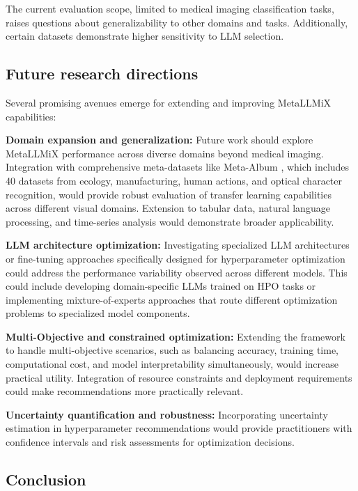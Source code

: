 \documentclass{article}
\begin{document}
The current evaluation scope, limited to medical imaging classification tasks, raises questions about generalizability to other domains and tasks. Additionally, certain datasets demonstrate higher sensitivity to LLM selection.

\subsection{Future research directions}

Several promising avenues emerge for extending and improving MetaLLMiX capabilities:

\textbf{Domain expansion and generalization:} Future work should explore MetaLLMiX performance across diverse domains beyond medical imaging. Integration with comprehensive meta-datasets like Meta-Album \cite{ullah2022meta}, which includes 40 datasets from ecology, manufacturing, human actions, and optical character recognition, would provide robust evaluation of transfer learning capabilities across different visual domains. Extension to tabular data, natural language processing, and time-series analysis would demonstrate broader applicability.


\textbf{LLM architecture optimization:} Investigating specialized LLM architectures or fine-tuning approaches specifically designed for hyperparameter optimization could address the performance variability observed across different models. This could include developing domain-specific LLMs trained on HPO tasks or implementing mixture-of-experts approaches that route different optimization problems to specialized model components.

\textbf{Multi-Objective and constrained optimization:} Extending the framework to handle multi-objective scenarios, such as balancing accuracy, training time, computational cost, and model interpretability simultaneously, would increase practical utility. Integration of resource constraints and deployment requirements could make recommendations more practically relevant.


\textbf{Uncertainty quantification and robustness:} Incorporating uncertainty estimation in hyperparameter recommendations would provide practitioners with confidence intervals and risk assessments for optimization decisions. 

\subsection{Conclusion}
\end{document}
